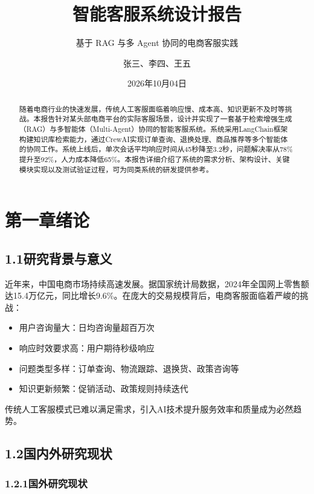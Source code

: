 \documentclass{harryopo-report}
\title{智能客服系统设计报告}
\subtitle{基于 RAG 与多 Agent 协同的电商客服实践}
\author{张三、李四、王五}
\institute{计算机学院 计算机应用技术}
\date{2026年10月04日}
\begin{document}
\maketitle

\begin{abstract}
随着电商行业的快速发展，传统人工客服面临着响应慢、成本高、知识更新不及时等挑战。本报告针对某头部电商平台的实际客服场景，设计并实现了一套基于检索增强生成（RAG）与多智能体（Multi-Agent）协同的智能客服系统。系统采用LangChain框架构建知识库检索能力，通过CrewAI实现订单查询、退换处理、商品推荐等多个智能体的协同工作。系统上线后，单次会话平均响应时间从45秒降至3.2秒，问题解决率从78\%提升至92\%，人力成本降低65\%。本报告详细介绍了系统的需求分析、架构设计、关键模块实现以及测试验证过程，可为同类系统的研发提供参考。
\end{abstract}

\tableofcontents

\chapter*{第一章绪论}

\section*{1.1研究背景与意义}

近年来，中国电商市场持续高速发展。据国家统计局数据，2024年全国网上零售额达15.4万亿元，同比增长9.6\%。在庞大的交易规模背后，电商客服面临着严峻的挑战：

\begin{itemize}
  \item {\fzht 用户咨询量大}：日均咨询量超百万次
  \item {\fzht 响应时效要求高}：用户期待秒级响应
  \item {\fzht 问题类型多样}：订单查询、物流跟踪、退换货、政策咨询等
  \item {\fzht 知识更新频繁}：促销活动、政策规则持续迭代
\end{itemize}

传统人工客服模式已难以满足需求，引入AI技术提升服务效率和质量成为必然趋势。

\section*{1.2国内外研究现状}

\subsection*{1.2.1国外研究现状}
\end{document}
